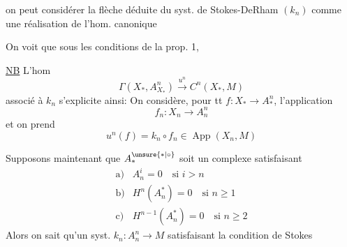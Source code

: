 
on peut considérer la flèche
déduite du syst. de Stokes-DeRham $(k_n)$ comme une réalisation de l'hom. canonique

On voit que sous les conditions de la prop. 1, 


\uline{NB} L'hom
\[
\Gamma(X_*,A^n_{X_*})\xrightarrow{u^n}C^n(X_*,M)
\]
associé à $k_n$ s'explicite ainsi: On considère, pour tt   $f:X_*\longrightarrow A_*^n$, l'application
\[
f_n:X_n\longrightarrow A_n^n
\]
et on prend
\[
u^n(f)=k_n\circ f_n\in\operatorname{App}(X_n,M)
\]


Supposons maintenant que $A_*^{\unsure{*|\circ}}$ soit un complexe  satisfaisant
\[
\begin{array}{ll}
\mathrm{a)}& A_n^i=0\quad\text{si }i>n\\
\mathrm{b)}& H^n(A_n^*)=0\quad\text{si }n\geq1\\
\mathrm{c)}& H^{n-1}(A_n^*)=0\quad\text{si }n\geq2
\end{array}
\]
Alors on sait qu'un syst. $k_n:A_n^n\longrightarrow M$ satisfaisant la condition de Stokes

